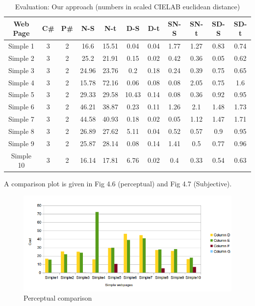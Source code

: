 \begin{table}[!htb]
\caption{Evaluation: Our approach (numbers in scaled CIELAB euclidean distance)}
\centering
\begin{tabular}{c c c c c c c c c c c}
\hline\hline
Web Page & C\# & P\# & N-S & N-t & D-S & D-t & SN-S & SN-t & SD-S & SD-t\\ [0.5ex]
\hline
Simple 1&3&2&16.6&15.51&0.04&0.04&1.77&1.27&0.83&0.74\\
Simple 2&3&2&25.2&21.91&0.15&0.02&0.42&0.36&0.05&0.62\\
Simple 3&3&2&24.96&23.76&0.2&0.18&0.24&0.39&0.75&0.65\\
Simple 4&3&2&15.78&72.16&0.06&0.08&0.08&2.05&0.75&1.6\\
Simple 5&3&2&29.33&29.58&10.43&0.14&0.08&0.36&0.92&0.95\\
Simple 6&3&2&46.21&38.87&0.23&0.11&1.26&2.1&1.48&1.73\\
Simple 7&3&2&44.58&40.93&0.18&0.02&0.05&1.12&1.47&1.71\\
Simple 8&3&2&26.89&27.62&5.11&0.04&0.52&0.57&0.9&0.95\\
Simple 9&3&2&25.87&28.14&0.08&0.14&1.41&0.5&0.77&0.96\\
Simple 10&3&2&16.14&17.81&6.76&0.02&0.4&0.33&0.54&0.63\\[1ex]
\hline
\end{tabular}
\label{table:nonlin}
\end{table}

A comparison plot is given in Fig 4.6 (perceptual) and Fig 4.7 (Subjective). 


\begin{figure}[!htb]
\centering
  \includegraphics[width=\linewidth]{simpleRP.png}
  \caption{Perceptual comparison}
  \label{fig:sub1}
\end{figure}

